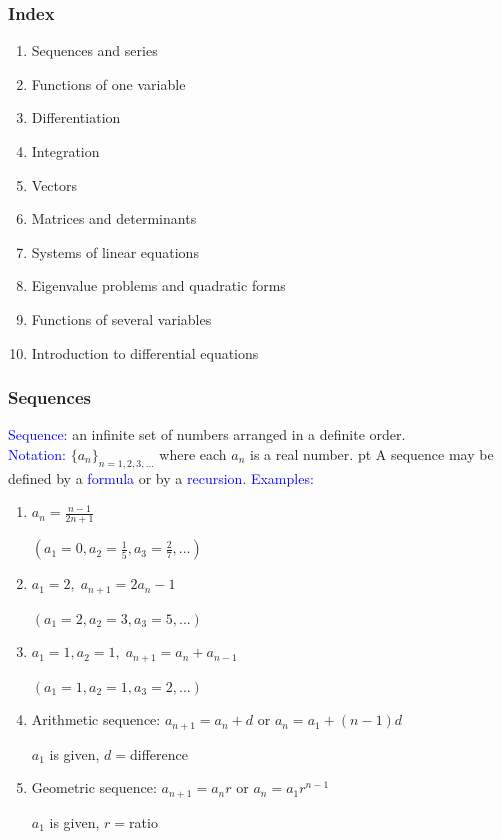 \documentclass[11pt,aspectratio=169]{beamer}
\begin{document}
\begin{frame}
\frametitle{Index}
\begin{enumerate}
\item Sequences and series
\item Functions of one variable
\item Differentiation
\item Integration
\item Vectors
\item Matrices and determinants
\item Systems of linear equations
\item Eigenvalue problems and quadratic forms
\item Functions of several variables
\item Introduction to differential equations
\end{enumerate}

\end{frame}


\begin{frame}
\frametitle{Sequences }
\textcolor{blue}{Sequence}: an infinite set of numbers arranged in a definite order. \\[3mm]

\textcolor{blue}{Notation:} $\{a_n\}_{n=1,2,3,...}$ where each $a_n$ is a real number.
 pt
A sequence may be defined by a \textcolor{blue}{formula} or by a \textcolor{blue}{recursion}.
\vskip 12pt
\textcolor{blue}{Examples:} 
\begin{enumerate}
\item $a_n=\frac{n-1}{2n+1}$\quad  \begin{tiny}$(a_1=0, a_2=\frac15,a_3=\frac27,...)$ \end{tiny}

\item $a_1=2, \; a_{n+1}=2a_n-1$\quad  \begin{tiny}$(a_1=
2, a_2=3,a_3=5,...)$ \end{tiny}



\item $a_1=1, a_2=1, \; a_{n+1}=a_n+a_{n-1}$\quad  \begin{tiny}$(a_1=1, a_2=1,a_3=2,...)$ \end{tiny}



\item \alert{Arithmetic sequence}: $a_{n+1}=a_n+d$ or $a_n=a_1+(n-1)d$

$a_1$ is given, $d=$difference 


\item \alert{Geometric sequence}: $a_{n+1}=a_n  r$ or $a_n=a_1 r^{n-1}$

$a_1$ is given, $r=$ratio
\end{enumerate}
\end{frame}
\end{document}
